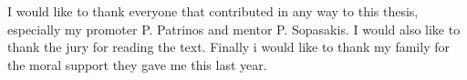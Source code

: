 \documentclass[master=ewit]{kulemt}
\begin{document}
\begin{preface}
I would like to thank everyone that contributed in any way to this thesis, especially my promoter P. Patrinos and mentor P. Sopasakis. I would also like to thank the jury for reading the text. Finally i would like to thank my family for the moral support they gave me this last year.
\end{preface}

\tableofcontents*



\listoffigures
\listoftables



\mainmatter

%










\appendixpage*          %
\appendix


\backmatter


\end{document}
